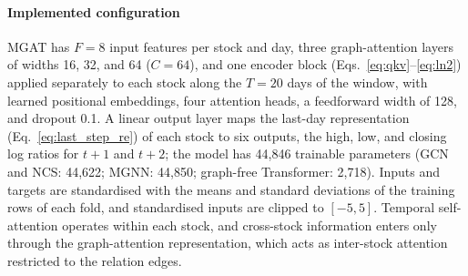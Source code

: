 \paragraph{Implemented configuration}
{\color{blue}MGAT has $F=8$ input features per stock and day, three graph-attention layers of widths 16, 32, and 64 ($C=64$), and one encoder block (Eqs.~\eqref{eq:qkv}--\eqref{eq:ln2}) applied separately to each stock along the $T=20$ days of the window, with learned positional embeddings, four attention heads, a feedforward width of 128, and dropout 0.1. A linear output layer maps the last-day representation (Eq.~\eqref{eq:last_step_re}) of each stock to six outputs, the high, low, and closing log ratios for $t+1$ and $t+2$; the model has 44{,}846 trainable parameters (GCN and NCS: 44{,}622; MGNN: 44{,}850; graph-free Transformer: 2{,}718). Inputs and targets are standardised with the means and standard deviations of the training rows of each fold, and standardised inputs are clipped to $[-5,5]$. Temporal self-attention operates within each stock, and cross-stock information enters only through the graph-attention representation, which acts as inter-stock attention restricted to the relation edges.\par}

